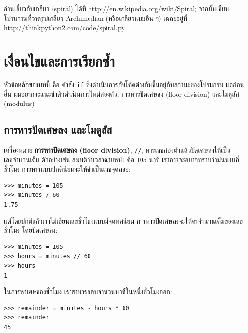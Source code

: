 \begin{exercise}

อ่านเกี่ยวกับเกลียว (spiral) ได้ที่ \url{http://en.wikipedia.org/wiki/Spiral}; 
จากนั้นเขียนโปรแกรมที่วาดรูปเกลียว Archimedian (หรือเกลียวแบบอื่น ๆ) 
เฉลยอยู่ที่ \url{http://thinkpython2.com/code/spiral.py}

\end{exercise}



\chapter{เงื่อนไขและการเรียกซ้ำ }%

หัวข้อหลักของบทนี้ คือ คำสั่ง {\tt if} ซึ่งดำเนินการกับโค้ดต่างกันขึ้นอยู่กับสถานะของโปรแกรม
แต่ก่อนอื่น ผมอยากจะแนะนำตัวดำเนินการใหม่สองตัว: การหารปัดเศษลง (floor division) และโมดูลัส (modulus)


\section{การหารปัดเศษลง %
และโมดูลัส} %

เครื่องหมาย {\bf การหารปัดเศษลง (floor division)}, \verb"//", หารเลขสองตัวแล้วปัดเศษลงให้เป็นเลขจำนวนเต็ม
ตัวอย่างเช่น สมมติว่าเวลาฉายหนัง คือ 105 นาที เราอาจจะอยากทราบว่ามันนานกี่ชั่วโมง การหารแบบปกตินิยมจะให้ค่าเป็นเลขจุดลอย:

\begin{verbatim}
>>> minutes = 105
>>> minutes / 60
1.75
\end{verbatim}

แต่โดยปกติแล้วเราไม่เขียนเลขชั่วโมงแบบมีจุดทศนิยม การหารปัดเศษลงจะให้ค่าจำนวนเต็มของเลขชั่วโมง โดยปัดเศษลง:

\begin{verbatim}
>>> minutes = 105
>>> hours = minutes // 60
>>> hours
1
\end{verbatim}

ในการหาเศษของชั่วโมง เราสามารถลบจำนวนนาทีในหนึ่งชั่วโมงออก:

\begin{verbatim}
>>> remainder = minutes - hours * 60
>>> remainder
45
\end{verbatim}


